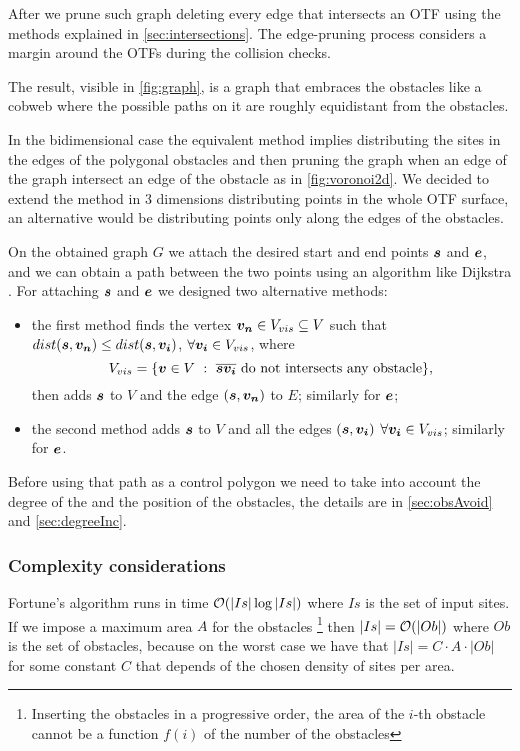 \documentclass[dissertation.tex]{subfiles}
\begin{document}
After we prune such graph deleting every edge that
intersects an \ac{OTF} using the methods explained in
\cref{sec:intersections}. The edge-pruning process considers a margin
around the \acp{OTF} during the collision checks.

The result, visible in \cref{fig:graph}, is a graph that embraces the
obstacles like a cobweb where the possible paths on it are roughly
equidistant from the obstacles.

In the bidimensional case the equivalent method implies distributing
the sites in the edges of the polygonal obstacles and then pruning the
graph when an edge of the graph intersect an edge of the obstacle as
in \cref{fig:voronoi2d}.
We decided to extend the method in 3 dimensions distributing points in
the whole \ac{OTF} surface, an alternative would be distributing
points only along the edges of the obstacles.

On the obtained graph $G$ we attach the desired start and end
points $\boldsymbol{s}$ and $\boldsymbol{e}$, and we can obtain a path between the two points using an
algorithm like Dijkstra \cite{dijkstra}\cite{knuth}. For attaching $\boldsymbol{s}$
and $\boldsymbol{e}$ we designed two
alternative methods:
\begin{itemize}
\item the first method finds the vertex $\boldsymbol{v_n}\in V_{vis}\subseteq V$ such
  that $dist(\boldsymbol{s},\boldsymbol{v_n})\leq dist(\boldsymbol{s},\boldsymbol{v_i})$, $\forall
  \boldsymbol{v_i}\in V_{vis}$, where
  \begin{equation*}
    V_{vis}=\{\boldsymbol{v}\in V\ :\ \overline{\boldsymbol{s} \boldsymbol{v_i}}\ \text{do not
      intersects any obstacle}\},
  \end{equation*}
  then adds $\boldsymbol{s}$ to $V$ and the edge $(\boldsymbol{s},\boldsymbol{v_n})$ to $E$;
  similarly for $\boldsymbol{e}$;
\item the second method adds $\boldsymbol{s}$ to $V$ and all the edges $(\boldsymbol{s},\boldsymbol{v_i})$
  $\forall \boldsymbol{v_i}\in V_{vis}$; similarly for $\boldsymbol{e}$.
\end{itemize}

Before using that path as a control polygon
we need to take into account the degree of the \bs and the
position of the obstacles, the details are in \cref{sec:obsAvoid} and
\cref{sec:degreeInc}.

\subsubsection{Complexity considerations}
Fortune's algorithm runs in time $\mathcal{O}(|Is|\log |Is|)$ \cite{deberg}
where $Is$ is
the set 
of input sites. If we impose a maximum area $A$ for the obstacles
\footnote{Inserting the obstacles in a progressive order, the area of the $i$-th
obstacle cannot be a function $f(i)$ of the number of
the obstacles} then $|Is|=\mathcal{O}(|Ob|)$ where $Ob$ is the set of
obstacles, because on the worst case we have that $|Is|=C\cdot A\cdot
|Ob|$ for
some constant $C$ that depends of the chosen density of sites per area.
\end{document}
